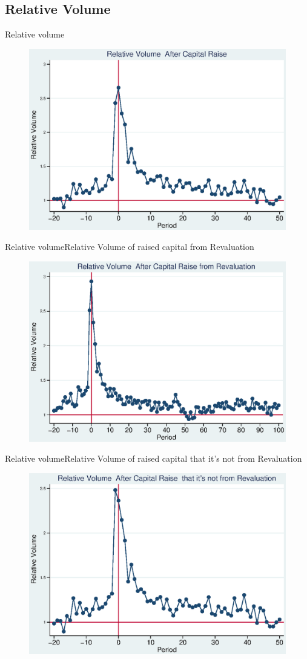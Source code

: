 \documentclass{beamer}
\begin{document}
\subsection{Relative Volume}
\begin{frame}{Relative volume}
\begin{figure}
\centering
\includegraphics[width=0.7\linewidth]{Output/Relvolume.eps}
\label{fig:relvolume}
\end{figure}
\end{frame}
\begin{frame}{Relative volume}{Relative Volume of raised capital from Revaluation}
\begin{figure}
\centering
\includegraphics[width=0.7\linewidth]{Output/Relvolume_Revaluation.eps}
\label{fig:relvolumerevaluation}
\end{figure}
\end{frame}
\begin{frame}{Relative volume}{Relative Volume of raised capital that it's not from Revaluation}
\begin{figure}
\centering
\includegraphics[width=0.7\linewidth]{Output/Relvolume_NoRevaluation.eps}
\label{fig:relvolumenorevaluation}
\end{figure}
\end{frame}
\end{document}
